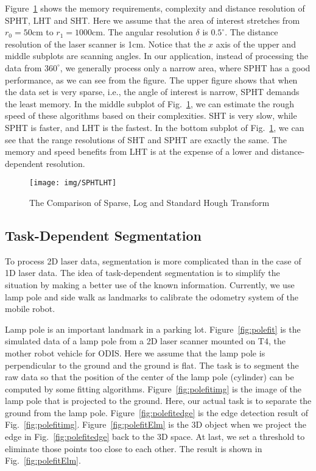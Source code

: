 \documentclass[twocolumn]{IEEEtran}
\begin{document}
Figure~\ref{fig:SPHTLHT} shows the memory requirements, complexity and distance resolution of SPHT, LHT and SHT. Here we assume that the area of interest stretches from $r_0=50$cm to $r_1=1000$cm. The angular resolution $\delta$ is $0.5^\circ$. The distance resolution of the laser scanner is 1cm. Notice that the $x$ axis of the upper and middle subplots are scanning angles. In our application, instead of processing the data from $360^\circ$, we generally process only a narrow area, where SPHT has a good performance, as we can see from the figure. The upper figure shows that when the data set is very sparse, i.e., the angle of interest is narrow, SPHT demands the least memory. In the middle subplot of Fig.~\ref{fig:SPHTLHT}, we can estimate the rough speed of these algorithms based on their complexities.  SHT is very slow, while SPHT is faster, and LHT is the fastest. In the bottom subplot of Fig.~\ref{fig:SPHTLHT}, we can see that the range resolutions of SHT and SPHT are exactly the same. The memory and speed benefits from LHT is at the expense of a lower and distance-dependent resolution. 


\begin{figure}
    \centering
    \texttt{[image: img/SPHTLHT]}
    \caption{The Comparison of Sparse, Log and Standard Hough Transform} \label{fig:SPHTLHT}
\end{figure}
\subsection{Task-Dependent Segmentation}
\label{sec24}


To process 2D laser data, segmentation is more complicated than in the case of 1D laser data. The idea of task-dependent segmentation is to simplify the situation by making a better use of the known information. Currently, we use lamp pole and side walk as landmarks to calibrate the odometry system of the mobile robot.

Lamp pole is an important landmark in a parking lot. Figure~\ref{fig:polefit} is the simulated data of a lamp pole from a 2D laser scanner mounted on T4, the mother robot  vehicle for ODIS. Here we assume that the lamp pole is perpendicular to the ground and the ground is flat. The task is to segment the raw data so that the position of the center of the lamp pole (cylinder) can be computed by some fitting algorithms. Figure~\ref{fig:polefitimg} is the image of the lamp pole that is projected to the ground. Here, our actual task is  to separate the ground from the lamp pole. Figure~\ref{fig:polefitedge} is the edge detection result of Fig.~\ref{fig:polefitimg}. Figure~\ref{fig:polefitElm} is the 3D object when we project the edge in Fig.~\ref{fig:polefitedge} back to the 3D space. At last, we set a threshold to eliminate those points too close to each other. The result is shown in Fig.~\ref{fig:polefitElm}. 
\end{document}
